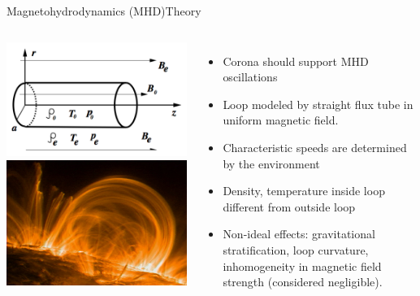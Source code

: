 \documentclass[table]{beamer}
\begin{document}
\begin{frame}{Magnetohydrodynamics (MHD)}{Theory}
    \begin{columns}
        \includegraphics[width=\textwidth]{cylinder.png}\\
        \includegraphics[width=\textwidth]{loop.jpg}
        \begin{itemize}
            \item Corona should support MHD oscillations
            \item Loop modeled by straight flux tube in uniform magnetic field.
            \item Characteristic speeds are determined by the
                environment
            \item Density, temperature inside loop different from outside
                loop
            \item Non-ideal effects: gravitational stratification,
                loop curvature, inhomogeneity in magnetic field strength
                (considered negligible).
        \end{itemize}
    \end{columns}
\end{frame}%
\end{document}
